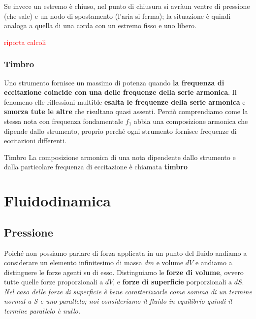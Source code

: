 \documentclass[x11names]{report}
\begin{document}
	Se invece un estremo è chiuso, nel punto di chiusura si avràun ventre di pressione (che sale) e un nodo di spostamento (l'aria si ferma); la situazione è quindi analoga a quella di una corda con un estremo fisso e uno libero.
	
	\begin{center}
		\textcolor{red}{riporta calcoli}
	\end{center}
	
	\subsection{Timbro}
	Uno strumento fornisce un massimo di potenza quando \textbf{la frequenza di eccitazione coincide con una delle frequenze della serie armonica}. Il fenomeno elle riflessioni multible \textbf{esalta le frequenze della serie armonica} e \textbf{smorza tute le altre} che risultano quasi assenti. Perciò comprendiamo come la stessa nota con frequenza fondamentale \(f_1\) abbia una composizione armonica che dipende dallo strumento, proprio perché ogni strumento fornisce frequenze di eccitazioni differenti.
	
	\begin{center}
		\colorbox{yblue}{\begin{minipage}{5.75in}
				\begin{blues}{Timbro}
					La composizione armonica di una nota dipendente dallo strumento e dalla particolare frequenza di eccitazione è chiamata \textbf{timbro}
				\end{blues}
		\end{minipage}}
	\end{center}
	
	
	
	
	\chapter{Fluidodinamica}
	\section{Pressione}
	Poiché non possiamo parlare di forza applicata in un punto del fluido andiamo a considerare un elemento infinitesimo di massa \(dm\) e volume \(dV\) e andiamo a distinguere le forze agenti su di esso. Distinguiamo le \textbf{forze di volume}, ovvero tutte quelle forze proporzionali a \(dV\), e \textbf{forze di superficie} porporzionali a \(dS\). \textit{Nel caso delle forze di superficie è bene caratterizzarle come somma di un termine normal a S e uno parallelo; noi consideriamo il fluido in equilibrio quindi il termine parallelo è nullo.}
	
\end{document}
